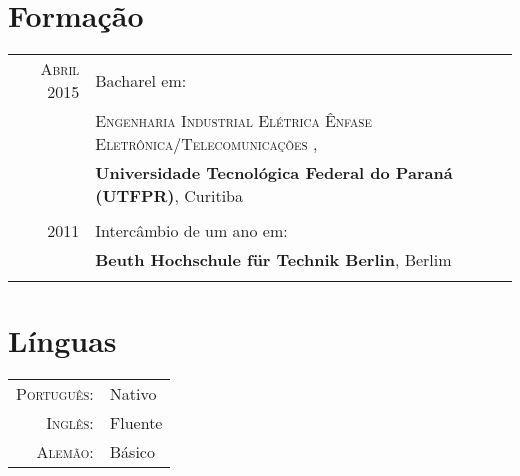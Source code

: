 \documentclass[a4paper,10pt]{article}
\begin{document}

\section{Formação}
    \begin{tabular}{rl}
        \textsc{Abril} 2015 & Bacharel em: \\
                            &\textsc
                            {Engenharia Industrial Elétrica Ênfase
                                    Eletrônica/Telecomunicações }, \\

                            &\textbf
                            {Universidade Tecnológica
                                Federal do Paraná (UTFPR)},
                            Curitiba \\ \\

        \textsc{2011}       & Intercâmbio de um ano em: \\

                            & \textbf
                            {Beuth Hochschule für Technik Berlin},
                            Berlim \\ \\
    \end{tabular}


\section{Línguas}
    \begin{tabular}{rl}
        \textsc{Português:} &Nativo\\
        \textsc{Inglês:}    &Fluente\\
        \textsc{Alemão:}    &Básico\\
    \end{tabular}
\end{document}
